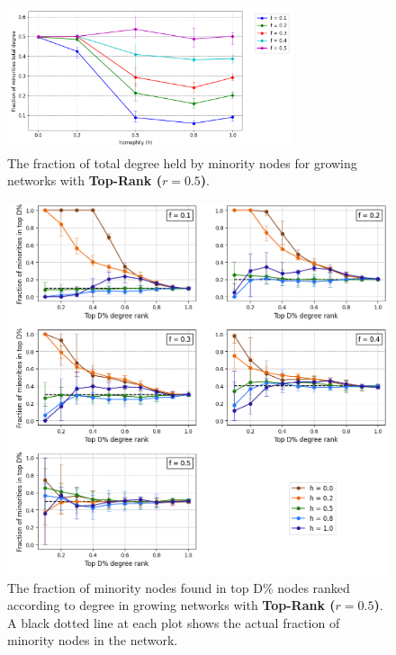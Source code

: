 \begin{appendices}
\begin{figure}
	\centering
	\includegraphics[trim=0 5 0 10, clip, width=0.75\textwidth]{images/mf_growth_top05.png}
	\caption{The fraction of total degree held by minority nodes for growing networks with \textbf{Top-Rank ($r = 0.5$)}.}
	\label{mf_growth_top05_fig}
\end{figure}

\begin{figure}[h!]
	\centering
	\includegraphics[trim=0 10 0 5, clip, width=1.0\textwidth]{images/top_growth_top05.png}
	\caption{The fraction of minority nodes found in top D\% nodes ranked according to degree in growing networks with \textbf{Top-Rank ($r = 0.5$)}. A black dotted line at each plot shows the actual fraction of minority nodes in the network.}
	\label{top_growth_top05_fig}
\end{figure}


\end{appendices}
